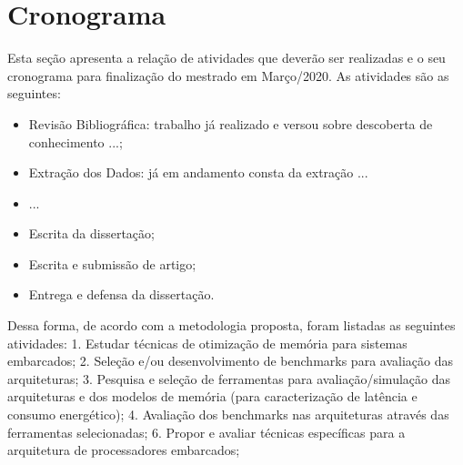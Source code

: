 \documentclass[diss-proposta,nocipinfo]{texufpel}
\begin{document}






\chapter{Cronograma}

Esta seção apresenta a relação de atividades que deverão ser realizadas e o seu  cronograma para finalização do mestrado em Março/2020. As atividades são as seguintes:

\begin{itemize}
\item Revisão Bibliográfica: trabalho já realizado e versou sobre descoberta de conhecimento ...;
\item Extração dos Dados: já em andamento consta da extração ...
\item ...
\item Escrita da  dissertação;
\item Escrita e submissão de artigo;
\item Entrega e defensa da dissertação.
\end{itemize}

Dessa forma, de acordo com a metodologia proposta, foram listadas as
seguintes atividades:
1. Estudar técnicas de otimização de memória para sistemas embarcados;
2. Seleção e/ou desenvolvimento de benchmarks para avaliação das arquiteturas;
3. Pesquisa e seleção de ferramentas para avaliação/simulação das arquiteturas
e dos modelos de memória (para caracterização de latência e consumo energético);
4. Avaliação dos benchmarks nas arquiteturas através das ferramentas
selecionadas;
6. Propor e avaliar técnicas específicas para a arquitetura de processadores
embarcados;
\end{document}
